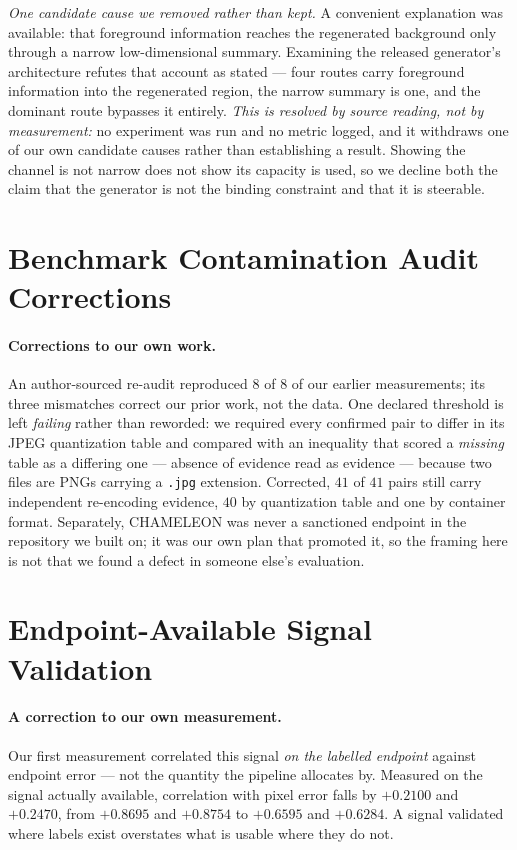 \documentclass{article} %
\begin{document}
\emph{One candidate cause we removed rather than kept.} A convenient explanation was available: that
foreground information reaches the regenerated background only through a narrow low-dimensional
summary. Examining the released generator's architecture refutes that account as stated --- four routes
carry foreground information into the regenerated region, the narrow summary is one, and the dominant
route bypasses it entirely. \emph{This is resolved by source reading, not by measurement:} no
experiment was run and no metric logged, and it withdraws one of our own candidate causes rather than
establishing a result. Showing the channel is not narrow does not show its capacity is used, so we
decline both the claim that the generator is not the binding constraint and that it is steerable.



\section{Benchmark Contamination Audit Corrections}

\paragraph{Corrections to our own work.} An author-sourced re-audit reproduced $8$ of $8$ of our
earlier measurements; its three mismatches correct our prior work, not the data. One declared
threshold is left \emph{failing} rather than reworded: we required every confirmed pair to differ in
its JPEG quantization table and compared with an inequality that scored a \emph{missing} table as a
differing one --- absence of evidence read as evidence --- because two files are PNGs carrying a
\texttt{.jpg} extension. Corrected, $41$ of $41$ pairs still carry independent re-encoding evidence,
$40$ by quantization table and one by container format. Separately, CHAMELEON was never a sanctioned
endpoint in the repository we built on; it was our own plan that promoted it, so the framing here is
not that we found a defect in someone else's evaluation.


\section{Endpoint-Available Signal Validation}

\paragraph{A correction to our own measurement.} Our first measurement correlated this signal \emph{on
the labelled endpoint} against endpoint error --- not the quantity the pipeline allocates by. Measured
on the signal actually available, correlation with pixel error falls by $+0.2100$ and $+0.2470$, from
$+0.8695$ and $+0.8754$ to $+0.6595$ and $+0.6284$. A signal validated where labels exist overstates
what is usable where they do not.
\end{document}
